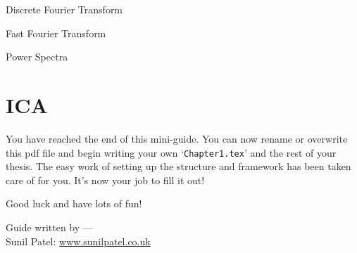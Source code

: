 \begin{compactitem}
\item {Discrete Fourier Transform}

\item {Fast Fourier Transform}

\item {Power Spectra}

\end{compactitem}


\section{ICA}

You have reached the end of this mini-guide. You can now rename or overwrite this pdf file and begin writing your own `\texttt{Chapter1.tex}' and the rest of your thesis. The easy work of setting up the structure and framework has been taken care of for you. It's now your job to fill it out!

Good luck and have lots of fun!

\begin{flushright}
Guide written by ---\\
Sunil Patel: \href{http://www.sunilpatel.co.uk}{www.sunilpatel.co.uk}
\end{flushright}
